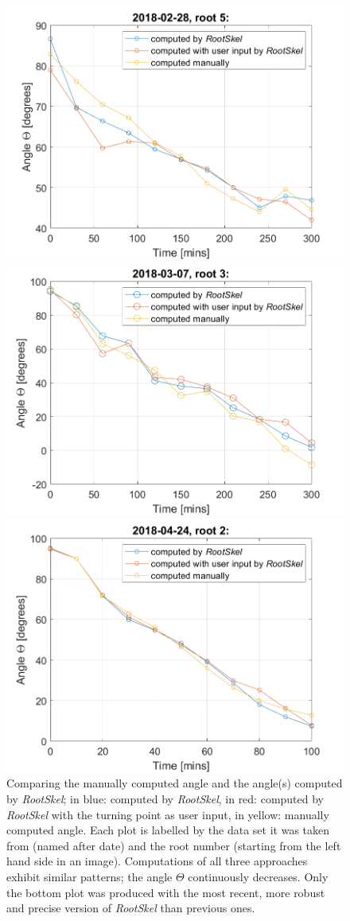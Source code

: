 \begin{figure}[H]

\centering

\includegraphics[width=.65\textwidth]{../Figures/2018-02-28.png}

\includegraphics[width=.65\textwidth]{../Figures/2018-03-07.png}

\includegraphics[width=.65\textwidth]{../Figures/2018-04-24.png}

	\caption{
	Comparing the manually computed angle and the angle(s) computed by \textit{RootSkel}; in blue: computed by \textit{RootSkel}, in red: computed by \textit{RootSkel} with the turning point as user input, in yellow: manually computed angle. Each plot is labelled by the data set it was taken from (named after date) and the root number (starting from the left hand side in an image). Computations of all three approaches exhibit similar patterns; the angle \( \Theta \) continuously decreases. %
	Only the bottom plot was produced with the most recent, more robust and precise version of \textit{RootSkel} than previous ones.
		}
\label{fig:resultPlots}
\end{figure}


